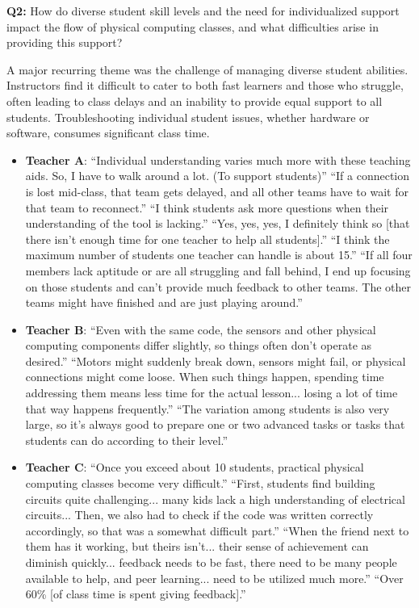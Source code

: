 \documentclass{article} %
\begin{document}
\vspace{1em}
\textbf{Q2:} How do diverse student skill levels and the need for individualized support impact the flow of physical computing classes, and what difficulties arise in providing this support?
\begin{summarybox}
A major recurring theme was the challenge of managing diverse student abilities.
Instructors find it difficult to cater to both fast learners and those who struggle, often leading to class delays and an inability to provide equal support to all students.
Troubleshooting individual student issues, whether hardware or software, consumes significant class time.

\begin{itemize}[itemsep=0em, topsep=0.5em, labelsep=0.5em, leftmargin=0.5em]
    \item \textbf{Teacher A}: ``Individual understanding varies much more with these teaching aids. So, I have to walk around a lot. (To support students)''  ``If a connection is lost mid-class, that team gets delayed, and all other teams have to wait for that team to reconnect.''  ``I think students ask more questions when their understanding of the tool is lacking.''  ``Yes, yes, yes, I definitely think so [that there isn't enough time for one teacher to help all students].''  ``I think the maximum number of students one teacher can handle is about 15.''  ``If all four members lack aptitude or are all struggling and fall behind, I end up focusing on those students and can't provide much feedback to other teams. The other teams might have finished and are just playing around.'' 
    \item \textbf{Teacher B}: ``Even with the same code, the sensors and other physical computing components differ slightly, so things often don't operate as desired.''  ``Motors might suddenly break down, sensors might fail, or physical connections might come loose. When such things happen, spending time addressing them means less time for the actual lesson... losing a lot of time that way happens frequently.''  ``The variation among students is also very large, so it's always good to prepare one or two advanced tasks or tasks that students can do according to their level.'' 
    \item \textbf{Teacher C}: ``Once you exceed about 10 students, practical physical computing classes become very difficult.''  ``First, students find building circuits quite challenging... many kids lack a high understanding of electrical circuits... Then, we also had to check if the code was written correctly accordingly, so that was a somewhat difficult part.''  ``When the friend next to them has it working, but theirs isn't... their sense of achievement can diminish quickly... feedback needs to be fast, there need to be many people available to help, and peer learning... need to be utilized much more.''  ``Over 60\% [of class time is spent giving feedback].''

\end{itemize}
\end{summarybox}
\end{document}
